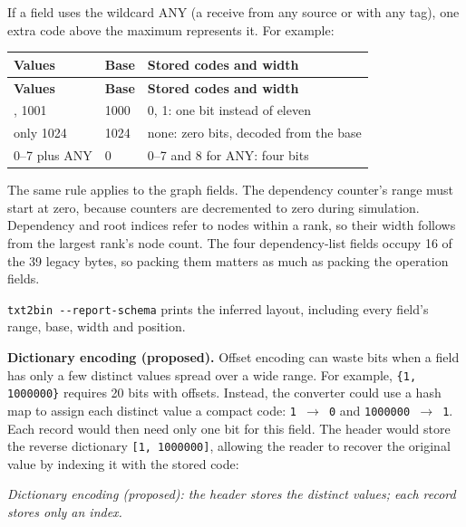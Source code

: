 \documentclass[10pt,a4paper]{article}
\begin{document}
 If a field uses the wildcard ANY (a receive from any source or with any tag), one extra code above the maximum represents it. For example:

{\small
\begin{longtable}{P{0.22\dimexpr{}\tabcolsep\relax}P{0.37\dimexpr{}\tabcolsep\relax}P{0.41\dimexpr{}\tabcolsep\relax}}
\toprule
\textbf{Values} & \textbf{Base} & \textbf{Stored codes and width} \\
\midrule
\endfirsthead
\toprule
\textbf{Values} & \textbf{Base} & \textbf{Stored codes and width} \\
\midrule
\endhead
\bottomrule
{}, 1001 & 1000 & 0, 1: one bit instead of eleven \\
only 1024 & 1024 & none: zero bits, decoded from the base \\
0--7 plus ANY & 0 & 0--7 and 8 for ANY: four bits \\
\end{longtable}
}

The same rule applies to the graph fields. The dependency counter's range must start at zero, because counters are decremented to zero during simulation. Dependency and root indices refer to nodes within a rank, so their width follows from the largest rank's node count. The four dependency-list fields occupy 16 of the 39 legacy bytes, so packing them matters as much as packing the operation fields.

\texttt{txt2bin -\allowbreak{}-\allowbreak{}report-\allowbreak{}schema} prints the inferred layout, including every field's range, base, width and position.

\textbf{Dictionary encoding (proposed).} Offset encoding can waste bits when a field has only a few distinct values spread over a wide range. For example, \texttt{\{1, 1000000\}} requires 20 bits with offsets. Instead, the converter could use a hash map to assign each distinct value a compact code: \texttt{1 \(\rightarrow\) 0} and \texttt{1000000 \(\rightarrow\) 1}. Each record would then need only one bit for this field. The header would store the reverse dictionary \texttt{[1, 1000000]}, allowing the reader to recover the original value by indexing it with the stored code:

\begin{center}
\resizebox{0.8\linewidth}{!}{}
\par\nopagebreak\small\itshape Dictionary encoding (proposed): the header stores the distinct values; each record stores only an index.
\end{center}
\end{document}

